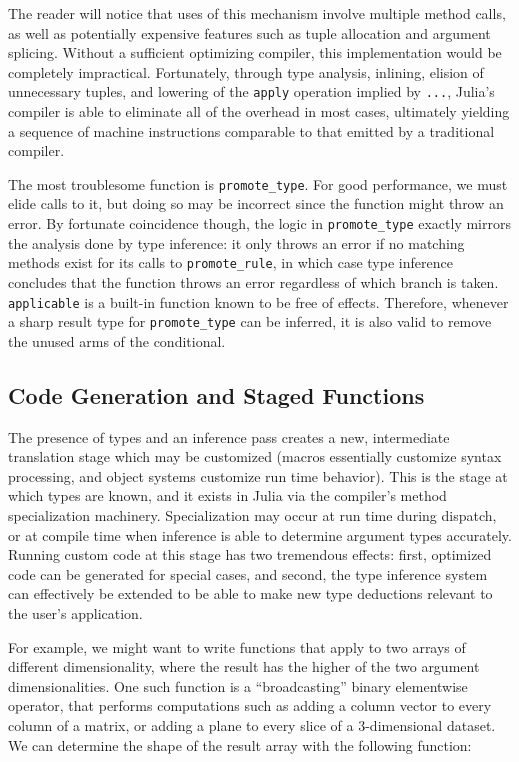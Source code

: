 \documentclass[9pt]{sigplanconf}
\begin{document}
The reader will notice that uses of this mechanism involve multiple method
calls, as well as potentially expensive features such as tuple allocation
and argument splicing. Without a sufficient optimizing compiler, this
implementation would be completely impractical. Fortunately, through
type analysis, inlining, elision of unnecessary tuples, and lowering of
the {\tt apply} operation implied by {\tt ...}, Julia's compiler is able
to eliminate all of the overhead in most cases, ultimately yielding a
sequence of machine instructions comparable to that emitted by a
traditional compiler.

The most troublesome function is {\tt promote\_type}. For good performance,
we must elide calls to it, but doing so may be incorrect since the function
might throw an error. By fortunate coincidence though, the logic in
{\tt promote\_type} exactly mirrors the analysis done by type inference: it
only throws an error if no matching methods exist for its calls to
{\tt promote\_rule}, in which case type inference concludes that the
function throws an error regardless of which branch is taken.
{\tt applicable} is a built-in function known to be free of effects.
Therefore, whenever a sharp result type for {\tt promote\_type} can be
inferred, it is also valid to remove the unused arms of the conditional.


\subsection{Code Generation and Staged Functions}

The presence of types and an inference pass creates a new, intermediate
translation stage which may be customized (macros essentially customize
syntax processing, and object systems customize run time behavior).
This is the stage at which types are known, and it exists in Julia via
the compiler's method specialization machinery. Specialization may occur
at run time during dispatch, or at compile time when inference is able
to determine argument types accurately.
Running custom code at this stage has two tremendous effects:
first, optimized code can be generated for special cases, and
second, the type inference system can effectively be extended to be able to
make new type deductions relevant to the user's application.

For example, we might want to write functions that apply to two
arrays of different dimensionality, where the result has the higher of the
two argument dimensionalities. One such function is a ``broadcasting''
binary elementwise operator, that performs computations such as adding a
column vector to every column of a matrix, or adding a plane to every slice
of a 3-dimensional dataset. We can determine the shape of the result
array with the following function:
\end{document}
